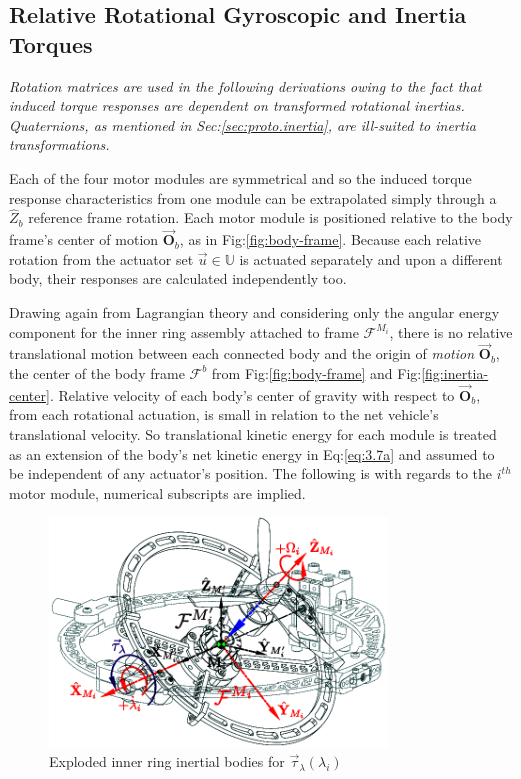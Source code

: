\subsection{Relative Rotational Gyroscopic and Inertia Torques}
\label{subsec:dynamics.nonlinearities.gyrotorques}
\emph{\color{gray}Rotation matrices are used in the following derivations owing to the fact that induced torque responses are dependent on transformed rotational inertias. Quaternions, as mentioned in Sec:\ref{sec:proto.inertia}, are ill-suited to inertia transformations.}
\par
Each of the four motor modules are symmetrical and so the induced torque response characteristics from one module can be extrapolated simply through a $\hat{Z}_b$ reference frame rotation. Each motor module is positioned relative to the body frame's center of motion $\vec{\mathbf{O}}_b$, as in Fig:\ref{fig:body-frame}. Because each relative rotation from the actuator set $\vec{u}\in\mathbb{U}$ is actuated separately and upon a different body, their responses are calculated independently too.
\par
Drawing again from Lagrangian theory and considering only the angular energy component for the inner ring assembly attached to frame $\mathcal{F}^{M_i}$, there is no relative translational motion between each connected body and the origin of \emph{motion} $\vec{\mathbf{O}}_b$, the center of the body frame $\mathcal{F}^b$ from Fig:\ref{fig:body-frame} and Fig:\ref{fig:inertia-center}. Relative velocity of each body's center of gravity with respect to $\vec{\mathbf{O}}_b$, from each rotational actuation, is small in relation to the net vehicle's translational velocity. So translational kinetic energy for each module is treated as an extension of the body's net kinetic energy in Eq:\ref{eq:3.7a} and assumed to be independent of any actuator's position. The following is with regards to the $i^{th}$ motor module, numerical subscripts are implied.
\begin{figure}[htbp]
\vspace{-10pt}
\centering
\includegraphics[width=0.8\textwidth]{figs/response-inner}
\vspace{-8pt}
\caption{Exploded inner ring inertial bodies for $\vec{\tau}_\lambda(\lambda_i)$}
\label{fig:response-inner}
\vspace{-16pt}
\end{figure}
